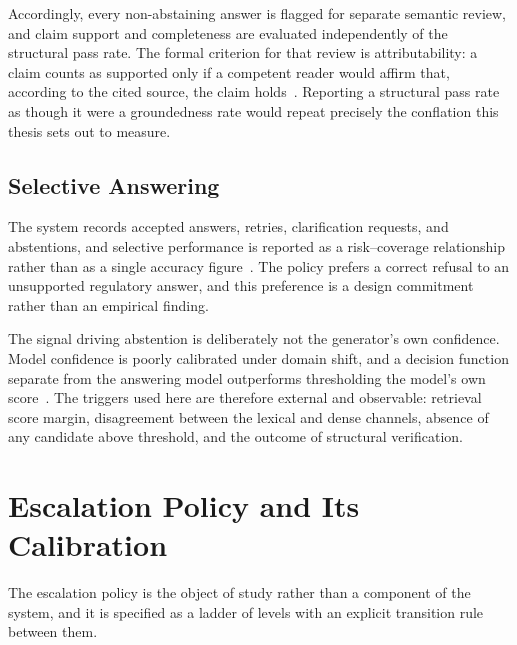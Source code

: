 Accordingly, every non-abstaining answer is flagged for separate semantic review, and claim support and completeness are evaluated independently of the structural pass rate. The formal criterion for that review is attributability: a claim counts as supported only if a competent reader would affirm that, according to the cited source, the claim holds~\cite{rashkin2023attribution}. Reporting a structural pass rate as though it were a groundedness rate would repeat precisely the conflation this thesis sets out to measure.

\subsection{Selective Answering}

The system records accepted answers, retries, clarification requests, and abstentions, and selective performance is reported as a risk--coverage relationship rather than as a single accuracy figure~\cite{geifman2017selective}. The policy prefers a correct refusal to an unsupported regulatory answer, and this preference is a design commitment rather than an empirical finding.

The signal driving abstention is deliberately not the generator's own confidence. Model confidence is poorly calibrated under domain shift, and a decision function separate from the answering model outperforms thresholding the model's own score~\cite{kamath2020selective}. The triggers used here are therefore external and observable: retrieval score margin, disagreement between the lexical and dense channels, absence of any candidate above threshold, and the outcome of structural verification.

\section{Escalation Policy and Its Calibration}
\label{sec:method-escalation}

The escalation policy is the object of study rather than a component of the system, and it is specified as a ladder of levels with an explicit transition rule between them.

